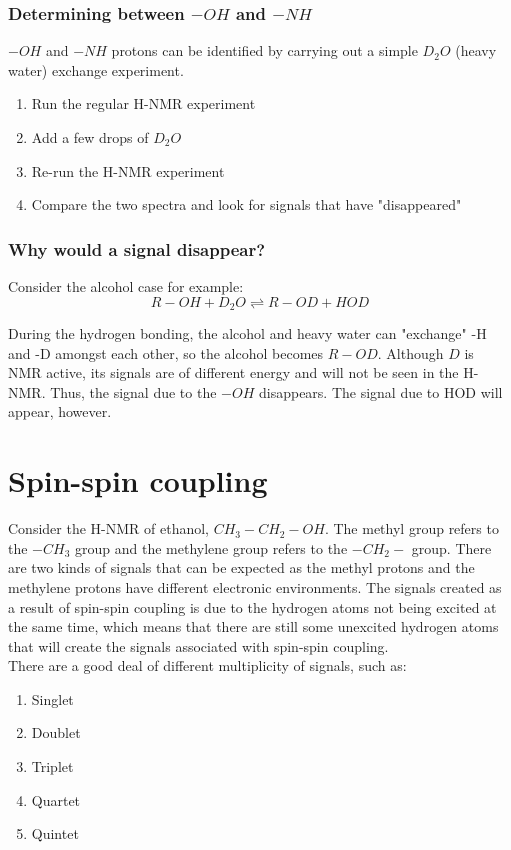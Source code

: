 \documentclass[11pt]{article}
\begin{document}
\subsubsection{Determining between \(-OH\) and \(-NH\)}
\label{sec:org394b98c}
\(-OH\) and \(-NH\) protons can be identified by carrying out a simple \(D_2O\) (heavy water) exchange experiment.
\begin{enumerate}
\item Run the regular H-NMR experiment
\item Add a few drops of \(D_2O\)
\item Re-run the H-NMR experiment
\item Compare the two spectra and look for signals that have "disappeared"
\end{enumerate}

\subsubsection{Why would a signal disappear?}
\label{sec:org0f1564e}
Consider the alcohol case for example:
\[R-OH + D_2O \rightleftharpoons R-OD + HOD\]

During the hydrogen bonding, the alcohol and heavy water can "exchange" -H and -D amongst each other, so the alcohol becomes \(R-OD\). Although \(D\) is NMR active, its signals are of different energy and will not be seen in the H-NMR. Thus, the signal due to the \(-OH\) disappears. The signal due to HOD will appear, however.

\newpage

\section{Spin-spin coupling}
\label{sec:org2fb9722}
Consider the H-NMR of ethanol, \(CH_3 - CH_2 - OH\). The methyl group refers to the \(-CH_3\) group and the methylene group refers to the \(-CH_2-\) group. There are two kinds of signals that can be expected as the methyl protons and the methylene protons have different electronic environments. The signals created as a result of spin-spin coupling is due to the hydrogen atoms not being excited at the same time, which means that there are still some unexcited hydrogen atoms that will create the signals associated with spin-spin coupling.
\\[0pt]

There are a good deal of different multiplicity of signals, such as:
\begin{enumerate}
\item Singlet
\item Doublet
\item Triplet
\item Quartet
\item Quintet
\end{enumerate}
\end{document}
